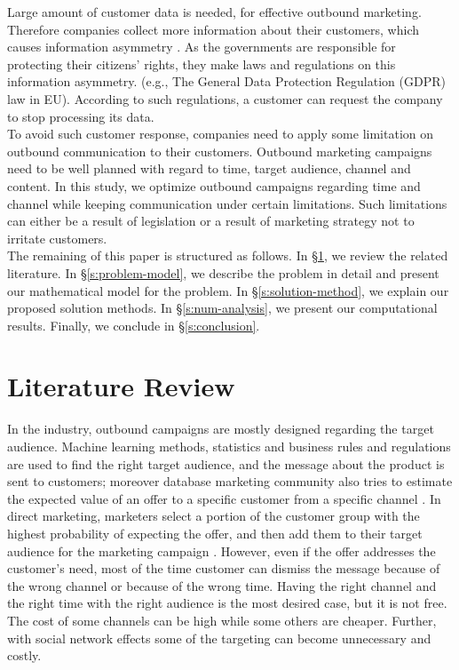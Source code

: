 \documentclass[11pt]{article}
\begin{document}
Large amount of customer data is needed, for effective outbound marketing. Therefore companies collect more information about their customers, which causes information asymmetry \citep{waerdt}. As the governments are responsible for protecting their citizens’ rights, they make laws and regulations on this information asymmetry. (e.g., The General Data Protection Regulation (GDPR) law in EU). According to such regulations, a customer can request the company to stop processing its data.\\

To avoid such customer response, companies need to apply some limitation on outbound communication to their customers. Outbound marketing campaigns need to be well planned with regard to time, target audience, channel and content. In this study, we optimize outbound campaigns regarding time and channel while keeping communication under certain limitations. Such limitations can either be a result of legislation or a result of marketing strategy not to irritate customers.\\

The remaining of this paper is structured as follows. In \S \ref{s:literature-review}, we review the related literature. In \S \ref{s:problem-model}, we describe the problem in detail and present our mathematical model for the problem. In \S \ref{s:solution-method}, we explain our proposed solution methods. In \S \ref{s:num-analysis}, we present our computational results. Finally, we conclude in \S \ref{s:conclusion}.


\section{Literature Review}  \label{s:literature-review}

In the industry, outbound campaigns are mostly designed regarding the target audience. Machine learning methods, statistics and business rules and regulations are used to find the right target audience, and the message about the product is sent to customers; moreover database marketing community also tries to estimate the expected value of an offer to a specific customer from a specific channel \citep{cohen_exp, oliveira_hypr}. In direct marketing, marketers select a portion of the customer group with the highest probability of expecting the offer, and then add them to their target audience for the marketing campaign \citep{owczarczuk}. However, even if the offer addresses the customer’s need, most of the time customer can dismiss the message because of the wrong channel or because of the wrong time. Having the right channel and the right time with the right audience is the most desired case, but it is not free. The cost of some channels can be high while some others are cheaper. Further, with social network effects some of the targeting can become unnecessary and costly.\\
\end{document}
